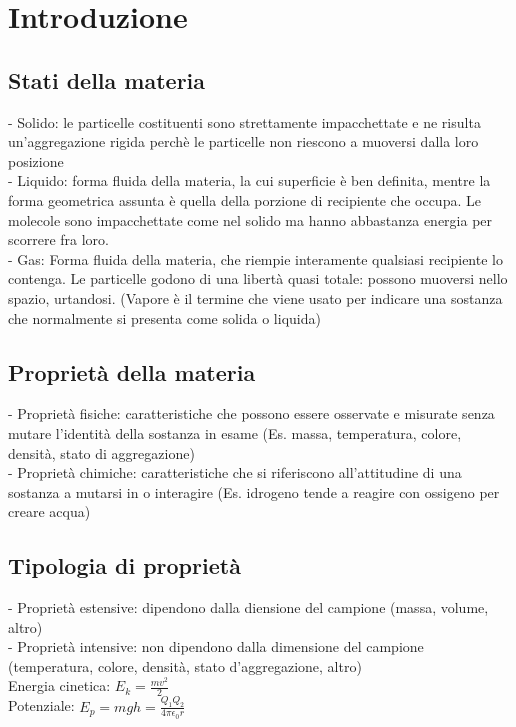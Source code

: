\section{Introduzione}
\subsection{Stati della materia}
- Solido: le particelle costituenti sono strettamente impacchettate e ne risulta un'aggregazione rigida perchè le particelle non riescono a muoversi dalla loro posizione\\
- Liquido: forma fluida della materia, la cui superficie è ben definita, mentre la forma geometrica assunta è quella della porzione di recipiente che occupa. Le molecole sono impacchettate come nel solido ma hanno abbastanza energia per scorrere fra loro.\\
- Gas: Forma fluida della materia, che riempie interamente qualsiasi recipiente lo contenga. Le particelle godono di una libertà quasi totale: possono muoversi nello spazio, urtandosi. (Vapore è il termine che viene usato per indicare una sostanza che normalmente si presenta come solida o liquida)
\subsection{Proprietà della materia}
- Proprietà fisiche: caratteristiche che possono essere osservate e misurate senza mutare l'identità della sostanza in esame (Es. massa, temperatura, colore, densità, stato di aggregazione)\\
- Proprietà chimiche: caratteristiche che si riferiscono all'attitudine di una sostanza a mutarsi in o interagire (Es. idrogeno tende a reagire con ossigeno per creare acqua)
\subsection{Tipologia di proprietà}
- Proprietà estensive: dipendono dalla diensione del campione (massa, volume, altro)\\
- Proprietà intensive: non dipendono dalla dimensione del campione (temperatura, colore, densità, stato d'aggregazione, altro)\\
Energia cinetica: $E_k = \frac{mv^2}{2}$\\
Potenziale: $E_p = mgh = \frac{Q_1 Q_2}{4\pi\epsilon_0 r}$